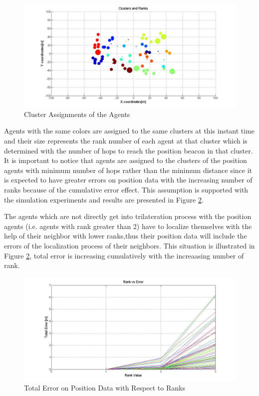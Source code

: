 \begin{figure}[H]
\caption{Cluster Assignments of the Agents} \label{Cluster_figure}
\centerline{\includegraphics[scale = 0.4]{Clusters_Ranks_1}}
\end{figure} 

Agents with the same colors are assigned to the same clusters at this instant time and their size represents the rank number of each agent at that cluster which is determined with the number of hops to reach the position beacon in that cluster. It is important to notice that agents are assigned to the clusters of the position agents with minimum number of hops rather than the minimum distance since it is expected to have greater errors on position data with the increasing number of ranks because of the cumulative error effect. This assumption is supported with the simulation experiments and results are presented in Figure \ref{cumulative_effect}. 

The agents which are not directly get into trilateration process with the position agents (i.e. agents with rank greater than 2) have to localize themselves with the help of their neighbor with lower ranks,thus their position data will include the errors of the localization process of their neighbors. This situation is illustrated in Figure \ref{cumulative_effect}, total error is increasing cumulatively with the increaasing number of rank. 
	
\begin{figure}[H]
\caption{Total Error on Position Data with Respect to Ranks} \label{cumulative_effect}
\centerline{\includegraphics[scale = 0.4]{Rank_vs_Error}}
\end{figure} 
	
